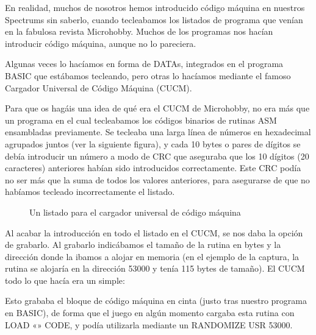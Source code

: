 \documentclass[letterpaper,10pt,spanish]{sphinxmanual}
\begin{document}
En realidad, muchos de nosotros hemos introducido código máquina en nuestros Spectrums sin saberlo, cuando tecleabamos los listados de programa que venían en la fabulosa revista Microhobby. Muchos de los programas nos hacían introducir código máquina, aunque no lo pareciera.

Algunas veces lo hacíamos en forma de DATAs, integrados en el programa BASIC que estábamos tecleando, pero otras lo hacíamos mediante el famoso Cargador Universal de Código Máquina (CUCM).

Para que os hagáis una idea de qué era el CUCM de Microhobby, no era más que un programa en el cual tecleabamos los códigos binarios de rutinas ASM ensambladas previamente. Se tecleaba una larga línea de números en hexadecimal agrupados juntos (ver la siguiente figura), y cada 10 bytes o pares de dígitos se debía introducir un número a modo de CRC que aseguraba que los 10 dígitos (20 caracteres) anteriores habían sido introducidos correctamente. Este CRC podía no ser más que la suma de todos los valores anteriores, para asegurarse de que no habíamos tecleado incorrectamente el listado.

\begin{figure}[htbp]
\centering
\capstart

\noindent{}
\caption{Un listado para el cargador universal de código máquina}\label{\detokenize{02_introduccion/introduccion:id6}}\end{figure}

Al acabar la introducción en todo el listado en el CUCM, se nos daba la opción de grabarlo. Al grabarlo indicábamos el tamaño de la rutina en bytes y la dirección donde la ibamos a alojar en memoria (en el ejemplo de la captura, la rutina se alojaría en la dirección 53000 y tenía 115 bytes de tamaño). El CUCM todo lo que hacía era un simple:

\begin{sphinxVerbatim}[commandchars=\\\{\}]
\end{sphinxVerbatim}

Esto grababa el bloque de código máquina en cinta (justo tras nuestro programa en BASIC), de forma que el juego en algún momento cargaba esta rutina con LOAD «» CODE, y podía utilizarla mediante un RANDOMIZE USR 53000.
\end{document}
